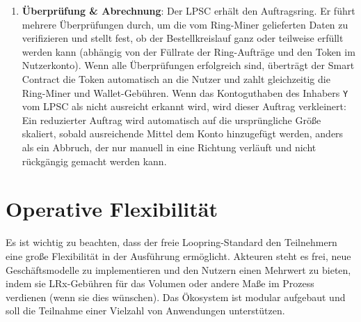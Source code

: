 \documentclass[UTF8,nofonts]{article}
\makeatletter
\newenvironment{figurehere}
 {\def\@captype{figure}}
 {}
\makeatother
\begin{document}
\begin{multicols}{2}
\begin{enumerate}
\item \textbf{Überprüfung \& Abrechnung}: Der LPSC erhält den Auftragsring. Er führt mehrere Überprüfungen durch, um die vom Ring-Miner gelieferten Daten zu verifizieren und stellt fest, ob der Bestellkreislauf ganz oder teilweise erfüllt werden kann (abhängig von der Füllrate der Ring-Aufträge und den Token im Nutzerkonto). Wenn alle Überprüfungen erfolgreich sind, überträgt der Smart Contract die Token automatisch an die Nutzer und zahlt gleichzeitig die Ring-Miner und Wallet-Gebühren. Wenn das Kontoguthaben des Inhabers \verb|Y| vom LPSC als nicht ausreicht erkannt wird, wird dieser Auftrag verkleinert: Ein reduzierter Auftrag wird automatisch auf die ursprüngliche Größe skaliert, sobald ausreichende Mittel dem Konto hinzugefügt werden, anders als ein Abbruch, der nur manuell in eine Richtung verläuft und nicht rückgängig gemacht werden kann.

\end{enumerate}





%
%
%

\section{Operative Flexibilität\label{sec:business_model}}
Es ist wichtig zu beachten, dass der freie Loopring-Standard den Teilnehmern eine große Flexibilität in der Ausführung ermöglicht. Akteuren steht es frei, neue Geschäftsmodelle zu implementieren und den Nutzern einen Mehrwert zu bieten, indem sie LRx-Gebühren für das Volumen oder andere Maße im Prozess verdienen (wenn sie dies wünschen). Das Ökosystem ist modular aufgebaut und soll die Teilnahme einer Vielzahl von Anwendungen unterstützen.


\end{multicols}
\end{document}
